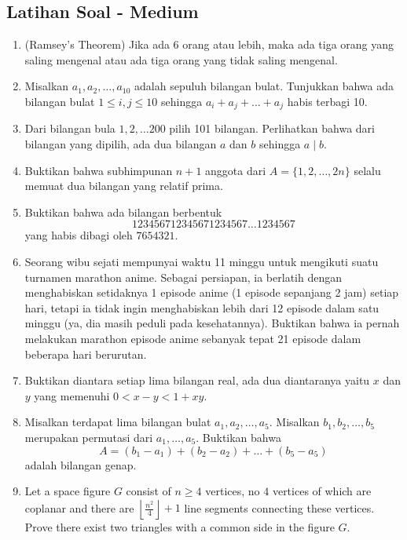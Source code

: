 \documentclass[11pt]{scrartcl}
\begin{document}
\subsection{Latihan Soal - Medium}
\begin{enumerate}
    \item (Ramsey's Theorem) Jika ada 6 orang atau lebih, maka ada tiga orang yang saling mengenal atau ada tiga orang yang tidak saling mengenal.

    \item Misalkan $a_1, a_2, \dots, a_{10}$ adalah sepuluh bilangan bulat. Tunjukkan bahwa ada bilangan bulat $1 \le i,j \le 10$ sehingga $a_i+a_j+\dots+a_j$ habis terbagi 10.

    \item Dari bilangan bula $1,2,\dots 200$ pilih 101 bilangan. Perlihatkan bahwa dari bilangan yang dipilih, ada dua bilangan $a$ dan $b$ sehingga $a \mid b$.

    \item Buktikan bahwa subhimpunan $n+1$ anggota dari $A=\{1,2,\dots, 2n\}$ selalu memuat dua bilangan yang relatif prima.

    \item Buktikan bahwa ada bilangan berbentuk $$123456712345671234567\dots1234567$$
    yang habis dibagi oleh $7654321$.

    \item Seorang wibu sejati mempunyai waktu 11 minggu untuk mengikuti suatu turnamen marathon anime. Sebagai persiapan, ia berlatih dengan menghabiskan setidaknya 1 episode anime (1 episode sepanjang 2 jam) setiap hari, tetapi ia tidak ingin menghabiskan lebih dari 12 episode dalam satu minggu (ya, dia masih peduli pada kesehatannya). Buktikan bahwa ia pernah melakukan marathon episode anime sebanyak tepat 21 episode dalam beberapa hari berurutan.

    \item Buktikan diantara setiap lima bilangan real, ada dua diantaranya yaitu $x$ dan $y$ yang memenuhi $0 < x-y < 1+xy$.

    \item Misalkan terdapat lima bilangan bulat $a_1, a_2, \dots, a_5$. Misalkan $b_1,b_2,\dots,b_5$ merupakan permutasi dari $a_1,\dots,a_5$. Buktikan bahwa 
    $$A=(b_1-a_1)+(b_2-a_2)+\dots+(b_5-a_5)$$ adalah bilangan genap.

    \item Let a space figure $G$ consist of $n \ge 4$ vertices, no $4$ vertices of which are coplanar and there are $\left\lfloor \frac{n^2}{4} \right\rfloor + 1$ line segments connecting these vertices. Prove there exist two triangles with a common side in the figure $G$.
    

\end{enumerate}
\end{document}
